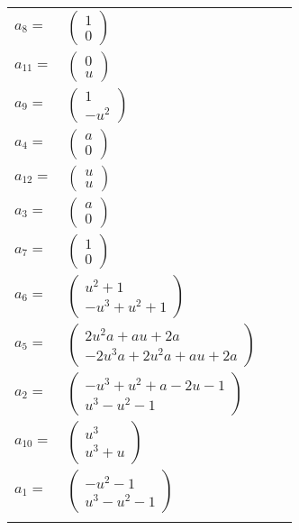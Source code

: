 \documentclass[1p]{elsarticle_modified}
\theoremstyle{definition}
\begin{document}
\begin{tabular}{m{7pt} m{180pt} m{7pt} m{180pt} }
\flushright $a_{8}=$&$\begin{pmatrix}1\\0\end{pmatrix}$ \\
\flushright $a_{11}=$&$\begin{pmatrix}0\\u\end{pmatrix}$ \\
\flushright $a_{9}=$&$\begin{pmatrix}1\\- u^2\end{pmatrix}$ \\
\flushright $a_{4}=$&$\begin{pmatrix}a\\0\end{pmatrix}$ \\
\flushright $a_{12}=$&$\begin{pmatrix}u\\u\end{pmatrix}$ \\
\flushright $a_{3}=$&$\begin{pmatrix}a\\0\end{pmatrix}$ \\
\flushright $a_{7}=$&$\begin{pmatrix}1\\0\end{pmatrix}$ \\
\flushright $a_{6}=$&$\begin{pmatrix}u^2+1\\- u^3+u^2+1\end{pmatrix}$ \\
\flushright $a_{5}=$&$\begin{pmatrix}2 u^2 a+a u+2 a\\-2 u^3 a+2 u^2 a+a u+2 a\end{pmatrix}$ \\
\flushright $a_{2}=$&$\begin{pmatrix}- u^3+u^2+a-2 u-1\\u^3- u^2-1\end{pmatrix}$ \\
\flushright $a_{10}=$&$\begin{pmatrix}u^3\\u^3+u\end{pmatrix}$ \\
\flushright $a_{1}=$&$\begin{pmatrix}- u^2-1\\u^3- u^2-1\end{pmatrix}$\\&\end{tabular}
\end{document}
